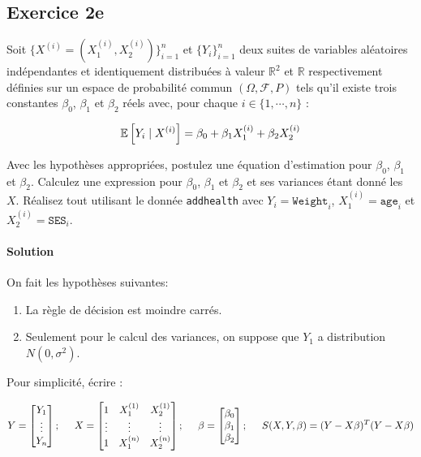 \documentclass[../main.tex]{subfiles}
\begin{document}
\begin{CJK*}{UTF8}{gbsn}
    
\section*{Exercice 2e}
Soit $\{X^{(i)} = (X^{(i)}_1,X^{(i)}_2)\}_{i=1}^n$ et $\{Y_i\}_{i=1}^n$
deux suites de variables aléatoires indépendantes et identiquement distribuées
à valeur $\mathbb{R}^2$ et $\mathbb{R}$ respectivement définies 
sur un espace de probabilité commun $(\Omega, \mathcal{F}, P)$ tels qu'il 
existe trois constantes $\beta_0$, $\beta_1$ et $\beta_2$ réels avec, 
pour chaque $i \in \{1, \cdots, n\}$ :

\begin{equation*}
    \mathbb{E} \squared{Y_i \mid X^{(i)}} = \beta_0 + \beta_1 X^{(i)}_1 + \beta_2 X^{(i)}_2
\end{equation*}

Avec les hypothèses appropriées, postulez une équation d'estimation pour $\beta_0$, $\beta_1$ et $\beta_2$.
Calculez une expression pour $\beta_0$, $\beta_1$ et $\beta_2$ et ses variances étant donné les $X$.
Réalisez tout utilisant le donnée \texttt{addhealth} avec $Y_i = \texttt{Weight}_i$,
$X^{(i)}_1 = \texttt{age}_i$ et $X^{(i)}_2 = \texttt{SES}_i$.

\smallskip
\paragraph{Solution}
On fait les hypothèses suivantes:

\begin{enumerate}
    \item La règle de décision est moindre carrés.
    \item Seulement pour le calcul des variances, on suppose que $Y_1$ a distribution $N(0, \sigma^2)$.
\end{enumerate}

Pour simplicité, écrire :

\begin{equation*}
    Y = 
    \begin{bmatrix}
        Y_1 \\
        \vdots \\
        Y_n
    \end{bmatrix}; \tab[0.5cm]
    X =
    \begin{bmatrix}
        1 & X^{(1)}_1 & X^{(1)}_2 \\
        \vdots & \vdots & \vdots \\
        1 & X^{(n)}_1 & X^{(n)}_2
    \end{bmatrix}; \tab[0.5cm]
    \beta =
    \begin{bmatrix}
        \beta_0 \\
        \beta_1 \\
        \beta_2
    \end{bmatrix}; \tab[0.5cm]
    S(X,Y,\beta) = (Y-X\beta)^T(Y-X\beta)
\end{equation*}


\end{CJK*}
\end{document}
